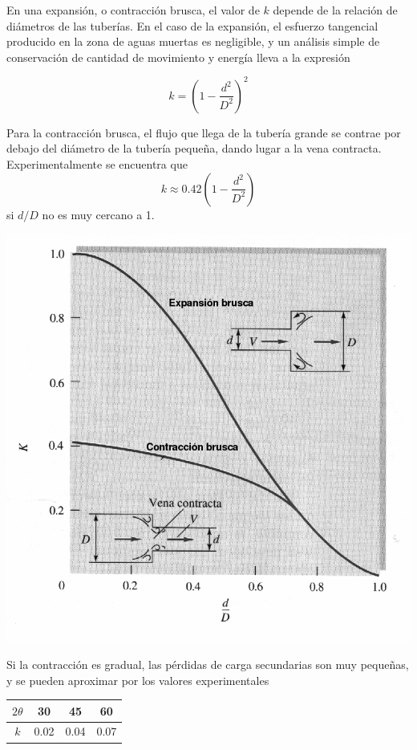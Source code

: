 En una expansión, o contracción brusca, el valor de $k$ depende de la relación de diámetros de las tuber\'ias. En el caso de la expansión, el esfuerzo tangencial producido en la zona de aguas muertas es negligible, y un análisis simple de conservación de cantidad de movimiento y energ\'ia lleva a la expresión

\begin{minipage}{10cm}
	\[
	k = \left(1 - \frac{d^2}{D^2}\right)^2
	\]
	
	Para la contracción brusca, el flujo que llega de la tuber\'ia grande se contrae por debajo del diámetro de la tuber\'ia peque\~na, dando lugar a la vena contracta. Experimentalmente se encuentra que
	\[
	k \approx 0.42 \left(1 - \frac{d^2}{D^2}\right)
	\]
	si $d/D$ no es muy cercano a 1.
\end{minipage}
\begin{minipage}{10cm}
	\begin{center}
		\includegraphics[scale=0.5]{TeX_files/chapter10-Tuberias/k-epansion-contraccion.png}
	\end{center}
\end{minipage}


Si la contracción es gradual, las pérdidas de carga secundarias son muy peque\~nas, y se pueden aproximar por los valores experimentales
\begin{center}
	\begin{tabular}{|c||c|c|c|}\hline
		$2\theta$ & 30 & 45 & 60 \\ \hline
		$k$ & 0.02 & 0.04 & 0.07 \\ \hline
	\end{tabular}
\end{center}

